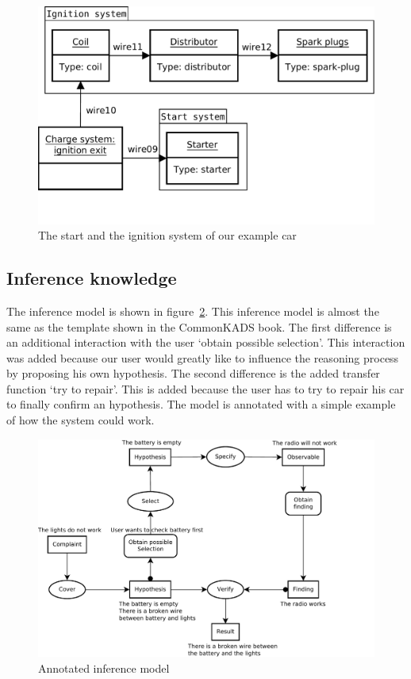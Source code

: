 \begin{figure}[htbp]
	\centering
		\includegraphics[width=1.00\textwidth]{StartAndIgnitionSystem.pdf}
	\caption{The start and the ignition system of our example car}
	\label{fig:StartAndIgnitionSystem}
\end{figure}


\subsection{Inference knowledge}
The inference model is shown in figure~\ref{fig:InferenceModel}. This inference
model is almost the same as the template shown in the CommonKADS book.
The first difference is an additional interaction with the user `obtain possible
selection'. This interaction was added because our user would greatly like to
influence the reasoning process by proposing his own hypothesis. The second
difference is the added transfer function `try to repair'. This is added because
the user has to try to repair his car to finally confirm an hypothesis. The model is
annotated with a simple example of how the system could work.

\begin{figure}[htbp]
	\centering
		\includegraphics[width=1.00\textwidth]{inferenceModel.pdf}
	\caption{Annotated inference model}
	\label{fig:InferenceModel}
\end{figure}


